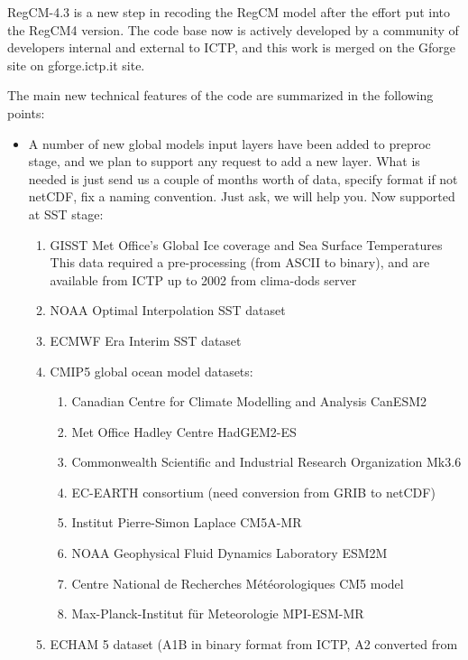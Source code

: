 %
%

RegCM-4.3 is a new step in recoding the RegCM model after the effort put into
the RegCM4 version. The code base now is actively developed by a community
of developers internal and external to ICTP, and this work is merged on the
Gforge site on gforge.ictp.it site.

The main new technical features of the code are summarized in the following
points:

\begin{itemize}
  \item A number of new global models input layers have been added to preproc
    stage, and we plan to support any request to add a new layer.
    What is needed is just send us a couple of months worth of data, specify
    format if not netCDF, fix a naming convention. Just ask, we will help you.
    Now supported at SST stage:
  \begin{enumerate}
    \item GISST Met Office's Global Ice coverage and Sea Surface Temperatures
     This data required a pre-processing (from ASCII to binary), and are
     available from ICTP up to 2002 from clima-dods server
    \item NOAA Optimal Interpolation SST dataset
    \item ECMWF Era Interim SST dataset
    \item CMIP5 global ocean model datasets:
      \begin{enumerate}
        \item Canadian Centre for Climate Modelling and Analysis CanESM2
        \item Met Office Hadley Centre HadGEM2-ES
        \item Commonwealth Scientific and Industrial Research Organization Mk3.6
        \item EC-EARTH consortium (need conversion from GRIB to netCDF)
        \item Institut Pierre-Simon Laplace CM5A-MR
        \item NOAA Geophysical Fluid Dynamics Laboratory ESM2M
        \item Centre National de Recherches Météorologiques CM5 model
        \item Max-Planck-Institut für Meteorologie MPI-ESM-MR
      \end{enumerate}
    \item ECHAM 5 dataset (A1B in binary format from ICTP, A2 converted from

\end{enumerate}
\end{itemize}
